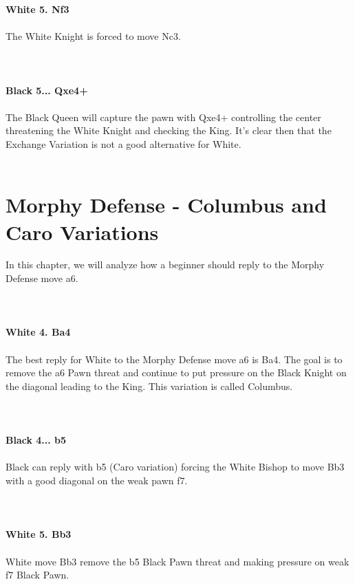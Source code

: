 \documentclass{article}
\begin{document}
\textbf{White 5. Nf3}\\
\\
The White Knight is forced to move Nc3.\\
\\

\\
\\
\textbf{Black 5... Qxe4+}\\
\\
The Black Queen will capture the pawn with Qxe4+ controlling the center threatening the White Knight and checking the King. It's clear then that the Exchange Variation is not a good alternative for White.\\
\\
\section{ Morphy Defense - Columbus and Caro Variations}

In this chapter, we will analyze how a beginner should reply to the Morphy Defense move a6.\\
\\

\\
\\
\textbf{White 4. Ba4}\\
\\
The best reply for White to the Morphy Defense move a6 is Ba4. The goal is to remove the a6 Pawn threat and continue to put pressure on the Black Knight on the diagonal leading to the King. This variation is called Columbus.\\
\\

\\
\\
\textbf{Black 4... b5}\\
\\
Black can reply with b5 (Caro variation) forcing the White Bishop to move Bb3 with a good diagonal on the weak pawn f7.\\
\\

\\
\\
\textbf{White 5. Bb3}\\
\\
White move Bb3 remove the b5 Black Pawn threat and making pressure on weak f7 Black Pawn.\\
\\
\end{document}
